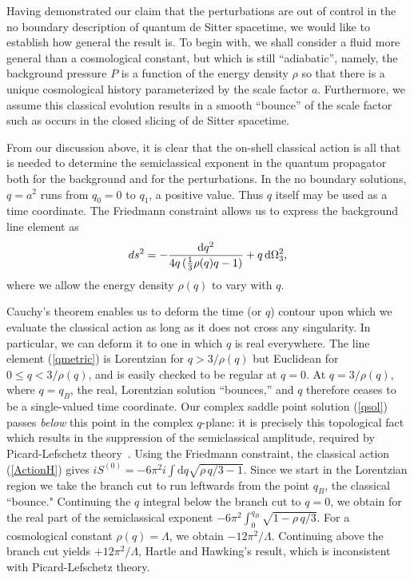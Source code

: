 \documentclass[twocolumn,amsmath,amssymb,superscriptaddress,nofootinbib]{revtex4-1}
\begin{document}
Having demonstrated our claim that the perturbations are out of control in the no boundary description of quantum de Sitter spacetime, we would like to establish how general the result is. To begin with, we shall consider a fluid more general than a cosmological constant, but which is still ``adiabatic'', namely, the background pressure $P$ is a function of the energy density $\rho$ so that there is a unique cosmological history parameterized by the scale factor $a$.  Furthermore, we assume this classical evolution results in a smooth ``bounce'' of the scale factor such as occurs in the closed slicing of de Sitter spacetime. 

From our discussion above, it is clear that the on-shell classical action is all that is needed to determine the semiclassical exponent in the quantum propagator both for the background and for the perturbations. In the no boundary solutions, $q=a^2$ runs from $q_0=0$ to $q_1$, a positive value. Thus $q$ itself may be used as a time coordinate. The Friedmann constraint allows us to express the  background line element as
\begin{equation}
ds^2=-{\mathrm{d}q^2\over 4 q\,(\frac{1}{3}\rho(q) q-1)}+q \,\mathrm{d}\Omega_3^2,
\label{qmetric}
\end{equation}
where we allow the energy density $\rho(q)$ to vary with $q$. 

Cauchy's theorem enables us to deform the time (or $q$) contour upon which we evaluate the classical action as long as it does not cross any singularity. In particular, we can deform it to one in which $q$ is real everywhere. The line element (\ref{qmetric}) is Lorentzian for $q>3/\rho(q) $ but Euclidean for $0\leq q<3/\rho(q)$, and is easily checked to be regular at $q=0$. At $q=3/\rho(q)$, where $q=q_B$, the real, Lorentzian solution ``bounces,'' and $q$ therefore ceases to be a single-valued time coordinate. Our complex saddle point solution (\ref{qsol}) passes {\it below} this point in the complex $q$-plane: it is precisely this topological fact which results in the suppression of the semiclassical amplitude, required by Picard-Lefschetz theory~\cite{Feldbrugge:2017kzv}. Using the Friedmann constraint, the classical action (\ref{ActionH}) gives $i S^{(0)}=-6\pi^2 i \int  \mathrm{d} q \sqrt{ \rho \,q/3-1}$. Since we start in the Lorentzian region we take the branch cut to run leftwards from the point $q_B$, the classical ``bounce." Continuing the $q$ integral below the branch cut to $q=0$, we obtain for the real part of the semiclassical exponent $-6 \pi^2 \int_0^{q_B}\sqrt{1-\rho \,q/3}$. For a cosmological constant $\rho(q) = \Lambda$, we obtain $-12 \pi^2/\Lambda$. Continuing  above the branch cut yields $+12 \pi^2/\Lambda$, Hartle and Hawking's result, which is inconsistent with Picard-Lefschetz theory. 
\end{document}
